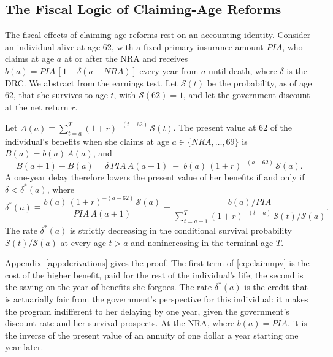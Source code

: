 \subsection{The Fiscal Logic of Claiming-Age Reforms}\label{sec:fw_claiming}

The fiscal effects of claiming-age reforms rest on an accounting identity. Consider an individual alive at age 62, with a fixed primary insurance amount $\mathit{PIA}$, who claims at age $a$ at or after the NRA and receives $b(a)=\mathit{PIA}\,[1+\delta(a-\mathit{NRA})]$ every year from $a$ until death, where $\delta$ is the DRC. We abstract from the earnings test. Let $\mathcal{S}(t)$ be the probability, as of age 62, that she survives to age $t$, with $\mathcal{S}(62)=1$, and let the government discount at the net return $r$.

\begin{lemma}\label{lem:claiming}
Let $A(a)\equiv\sum_{t=a}^{T}(1+r)^{-(t-62)}\,\mathcal{S}(t)$. The present value at 62 of the individual's benefits when she claims at age $a\in\{\mathit{NRA},\ldots,69\}$ is $B(a)=b(a)\,A(a)$, and
\begin{equation}\label{eq:claimnpv}
B(a+1)-B(a)=\delta\,\mathit{PIA}\,A(a+1)\;-\;b(a)\,(1+r)^{-(a-62)}\,\mathcal{S}(a).
\end{equation}
A one-year delay therefore lowers the present value of her benefits if and only if $\delta<\delta^{*}(a)$, where
\begin{equation}\label{eq:faircredit}
\delta^{*}(a)\equiv\frac{b(a)\,(1+r)^{-(a-62)}\,\mathcal{S}(a)}{\mathit{PIA}\,A(a+1)}
=\frac{b(a)/\mathit{PIA}}{\sum_{t=a+1}^{T}(1+r)^{-(t-a)}\,\mathcal{S}(t)/\mathcal{S}(a)}.
\end{equation}
The rate $\delta^{*}(a)$ is strictly decreasing in the conditional survival probability $\mathcal{S}(t)/\mathcal{S}(a)$ at every age $t>a$ and nonincreasing in the terminal age $T$.
\end{lemma}

\noindent Appendix~\ref{app:derivations} gives the proof. The first term of \eqref{eq:claimnpv} is the cost of the higher benefit, paid for the rest of the individual's life; the second is the saving on the year of benefits she forgoes. The rate $\delta^{*}(a)$ is the credit that is actuarially fair from the government's perspective for this individual: it makes the program indifferent to her delaying by one year, given the government's discount rate and her survival prospects. At the NRA, where $b(a)=\mathit{PIA}$, it is the inverse of the present value of an annuity of one dollar a year starting one year later.

